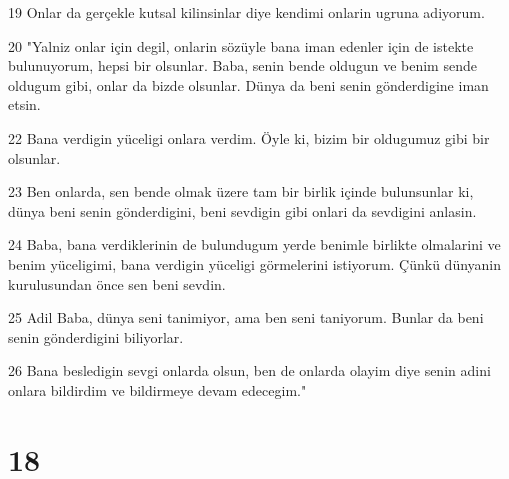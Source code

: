 \par 19 Onlar da gerçekle kutsal kilinsinlar diye kendimi onlarin ugruna adiyorum.
\par 20 "Yalniz onlar için degil, onlarin sözüyle bana iman edenler için de istekte bulunuyorum, hepsi bir olsunlar. Baba, senin bende oldugun ve benim sende oldugum gibi, onlar da bizde olsunlar. Dünya da beni senin gönderdigine iman etsin.
\par 22 Bana verdigin yüceligi onlara verdim. Öyle ki, bizim bir oldugumuz gibi bir olsunlar.
\par 23 Ben onlarda, sen bende olmak üzere tam bir birlik içinde bulunsunlar ki, dünya beni senin gönderdigini, beni sevdigin gibi onlari da sevdigini anlasin.
\par 24 Baba, bana verdiklerinin de bulundugum yerde benimle birlikte olmalarini ve benim yüceligimi, bana verdigin yüceligi görmelerini istiyorum. Çünkü dünyanin kurulusundan önce sen beni sevdin.
\par 25 Adil Baba, dünya seni tanimiyor, ama ben seni taniyorum. Bunlar da beni senin gönderdigini biliyorlar.
\par 26 Bana besledigin sevgi onlarda olsun, ben de onlarda olayim diye senin adini onlara bildirdim ve bildirmeye devam edecegim."

\chapter{18}

